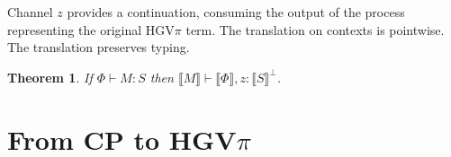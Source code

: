 \documentclass{easychair}
\makeatletter
\newtheorem{theorem}{Theorem}
\newcommand{\ba}{\begin{array}}
\newcommand{\ea}{\end{array}}
\newenvironment{equations}{\[\ba{@{}r@{~}c@{~}l@{}}}{\ea\]}
\newcommand{\cpj}[2]{{#1} \vdash {#2}}
\newcommand{\gvj}[3]{{#1} \vdash {#2} : {#3}}
\newcommand{\cpDual}[1]{{#1}^\bot}
\newcommand{\hgvpi}{HGV$\pi$\xspace}
\newcommand{\hgvcp}[1]{\llbracket{#1}\rrbracket}
\makeatother
\begin{document}
Channel $z$ provides a continuation, consuming the output of the process representing the original
\hgvpi term.
%
The translation on contexts is pointwise.
The translation preserves typing.
\begin{theorem}
If $\gvj{\Phi}{M}{S}$ then $\cpj{\hgvcp{M}}{\hgvcp{\Phi},z:\cpDual{\hgvcp{S}}}$.
\end{theorem}


\section{From CP to \hgvpi}
\end{document}
